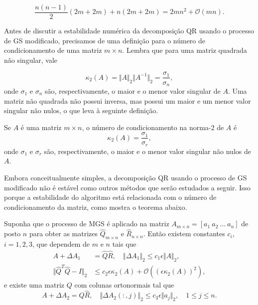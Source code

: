 \documentclass{article}
\begin{document}
\[
    \frac{n(n-1)}{2} (2m + 2m) + n(2m + 2m) = 2mn^2 + \mathcal{O}(mn).
\]

Antes de discutir a estabilidade numérica da decomposição QR usando o processo de GS modificado, precisamos de uma definição para o número de condicionamento de uma matriz \(m \times n\). Lembra que para uma matriz quadrada não singular, vale

\begin{equation}
    \kappa_2(A) = \Vert A \Vert_2 \Vert A^{-1} \Vert_2 = \frac{\sigma_1}{\sigma_n},
\end{equation}
onde \(\sigma_1\) e \(\sigma_n\) são, respectivamente, o maior e o menor valor singular de \(A\). Uma matriz não quadrada não possui inversa, mas possui um maior e um menor valor singular não nulos, o que leva à seguinte definição.

\begin{defn}
    Se \(A\) é uma matriz \(m \times n\), o número de condicionamento na norma-\(2\) de \(A\) é
    \begin{equation}
        \kappa_2(A) = \frac{\sigma_1}{\sigma_r},
    \end{equation}
    onde \(\sigma_1\) e \(\sigma_r\) são, respectivamente, o maior e o menor valor singular não nulos de \(A\).
\end{defn}

Embora conceitualmente simples, a decomposição QR usando o processo de GS modificado não é estável como outros métodos que serão estudados a seguir. Isso porque a estabilidade do algoritmo está relacionada com o número de condicionamento da matriz, como mostra o teorema abaixo.

\begin{thm}
    Suponha que o processo de MGS é aplicado na matriz \(A_{m \times n} = [a_1 \ a_2 \ \ldots \ a_n]\) de posto \(n\) para obter as matrizes \(\hat{Q}_{m \times n}\) e \(\hat{R}_{n \times n}\). Então existem constantes \(c_i\), \(i = 1, 2, 3\), que dependem de \(m\) e \(n\) tais que
    \begin{align*}
        A + \Delta A_1 &= \hat{Q} \hat{R}, \quad \Vert \Delta A_1 \Vert_2 \leq c_1 \epsilon \Vert A \Vert_2, \\
        \Vert \hat{Q}^T \hat{Q} - I \Vert_2 &\leq c_2 \epsilon \kappa_2(A) + \mathcal{O}((\epsilon \kappa_2(A))^2),
    \end{align*}
    e existe uma matriz \(Q\) com colunas ortonormais tal que
    \begin{equation*}
        A + \Delta A_2 = Q \hat{R}, \quad \Vert \Delta A_2 (:,j) \Vert_2 \leq c_3 \epsilon \Vert a_j \Vert_2, \quad 1 \leq j \leq n.
    \end{equation*}
\end{thm}
\end{document}

